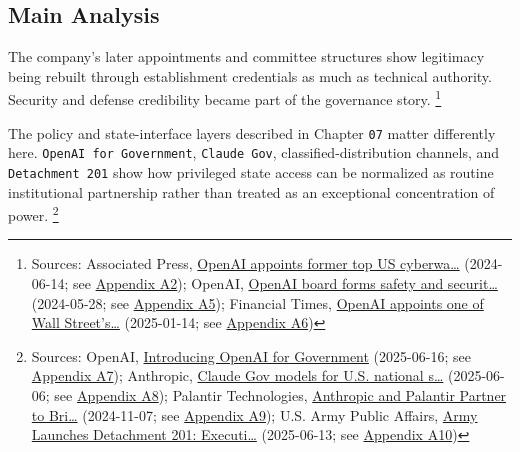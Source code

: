 \documentclass[
  american,
  11pt,
  letterpaper,
]{article}
\begin{document}
\subsection{Main Analysis}\label{main-analysis}

The company's later appointments and committee structures show
legitimacy being rebuilt through establishment credentials as much as
technical authority. Security and defense credibility became part of the
governance story. \footnote{Sources: Associated Press,
  \href{https://apnews.com/article/6ef612a3a0fcaef05480bbd1ebbd79b1}{OpenAI
  appoints former top US cyberwa\ldots{}} (2024-06-14; see
  \hyperref[appendix-a2-openai-appoints-former-top-us-cyberwarrior-paul-nakasone-to-its-board-of-directors]{Appendix
  A2}); OpenAI,
  \href{https://openai.com/index/openai-board-forms-safety-and-security-committee/}{OpenAI
  board forms safety and securit\ldots{}} (2024-05-28; see
  \hyperref[appendix-a5-openai-board-forms-safety-and-security-committee]{Appendix
  A5}); Financial Times,
  \href{https://www.ft.com/content/63b08a9d-e537-4d60-9904-c59958a16982}{OpenAI
  appoints one of Wall Street's\ldots{}} (2025-01-14; see
  \hyperref[appendix-a6-openai-appoints-one-of-wall-street-s-most-powerful-dealmakers-to-its-board]{Appendix
  A6})}

The policy and state-interface layers described in Chapter \texttt{07}
matter differently here. \texttt{OpenAI\ for\ Government},
\texttt{Claude\ Gov}, classified-distribution channels, and
\texttt{Detachment\ 201} show how privileged state access can be
normalized as routine institutional partnership rather than treated as
an exceptional concentration of power. \footnote{Sources: OpenAI,
  \href{https://openai.com/global-affairs/introducing-openai-for-government/}{Introducing
  OpenAI for Government} (2025-06-16; see
  \hyperref[appendix-a7-introducing-openai-for-government]{Appendix
  A7}); Anthropic,
  \href{https://www.anthropic.com/news/claude-gov-models-for-u-s-national-security-customers}{Claude
  Gov models for U.S. national s\ldots{}} (2025-06-06; see
  \hyperref[appendix-a8-claude-gov-models-for-u-s-national-security-customers]{Appendix
  A8}); Palantir Technologies,
  \href{https://investors.palantir.com/news-details/2024/Anthropic-and-Palantir-Partner-to-Bring-Claude-AI-Models-to-AWS-for-U.S.-Government-Intelligence-and-Defense-Operations/}{Anthropic
  and Palantir Partner to Bri\ldots{}} (2024-11-07; see
  \hyperref[appendix-a9-anthropic-and-palantir-partner-to-bring-claude-ai-models-to-aws-for-u-s-government-intelligence-and-defense-operations]{Appendix
  A9}); U.S. Army Public Affairs,
  \href{https://www.army.mil/article/286317/army_launches_detachment_201_executive_innovation_corps_to_drive_tech_transformation}{Army
  Launches Detachment 201: Executi\ldots{}} (2025-06-13; see
  \hyperref[appendix-a10-army-launches-detachment-201-executive-innovation-corps-to-drive-tech-transformation]{Appendix
  A10})}
\end{document}
